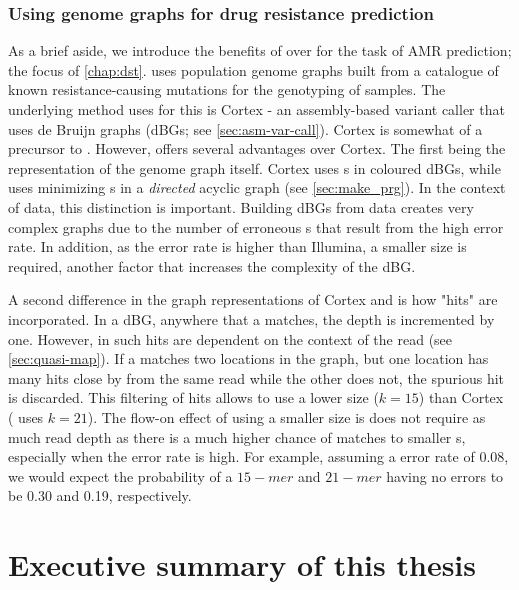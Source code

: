 \subsubsection{Using genome graphs for drug resistance prediction}
\label{sec:genome-graphs-dst}
As a brief aside, we introduce the benefits of \pandora{} over \mykrobe{} for the task of AMR prediction; the focus of \autoref{chap:dst}. \mykrobe{} uses population genome graphs built from a catalogue of known resistance-causing mutations for the genotyping of samples. The underlying method \mykrobe{} uses for this is Cortex \cite{iqbal2012} - an assembly-based variant caller that uses de Bruijn graphs (dBGs; see \autoref{sec:asm-var-call}). Cortex is somewhat of a precursor to \pandora{}. However, \pandora{} offers several advantages over Cortex. The first being the representation of the genome graph itself. Cortex uses \kmer{}s in coloured dBGs, while \pandora{} uses minimizing \kmer{}s in a \emph{directed} acyclic graph (see \autoref{sec:make_prg}). In the context of \ont{} data, this distinction is important. Building dBGs from \ont{} data creates very complex graphs due to the number of erroneous \kmer{}s that result from the high error rate. In addition, as the \ont{} error rate is higher than Illumina, a smaller \kmer{} size is required, another factor that increases the complexity of the dBG. 

A second difference in the graph representations of Cortex and \pandora{} is how \kmer{} "hits" are incorporated. In a dBG, anywhere that a \kmer{} matches, the depth is incremented by one. However, in \pandora{} such hits are dependent on the context of the read (see \autoref{sec:quasi-map}). If a \kmer{} matches two locations in the graph, but one location has many hits close by from the same read while the other does not, the spurious hit is discarded. This filtering of \kmer{} hits allows \pandora{} to use a lower \kmer{} size ($k=15$) than Cortex (\mykrobe{} uses $k=21$). The flow-on effect of using a smaller \kmer{} size is \pandora{} does not require as much read depth as there is a much higher chance of matches to smaller \kmer{}s, especially when the error rate is high. For example, assuming a \ont{} error rate of 0.08, we would expect the probability of a $15-mer$ and $21-mer$ having no errors to be 0.30 and 0.19, respectively.


\section{Executive summary of this thesis}

